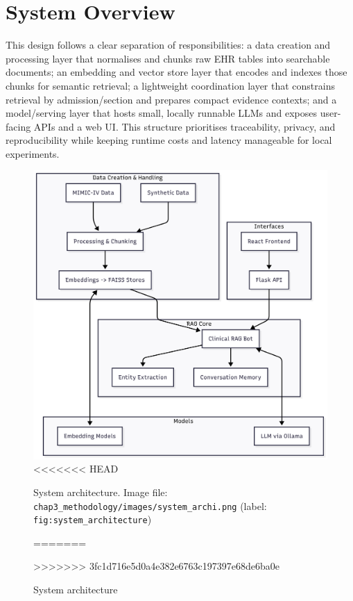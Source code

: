 \section{System Overview}

This design follows a clear separation of responsibilities: a data creation and processing layer that normalises and chunks raw EHR tables into searchable documents; an embedding and vector store layer that encodes and indexes those chunks for semantic retrieval; a lightweight coordination layer that constrains retrieval by admission/section and prepares compact evidence contexts; and a model/serving layer that hosts small, locally runnable LLMs and exposes user-facing APIs and a web UI. This structure prioritises traceability, privacy, and reproducibility while keeping runtime costs and latency manageable for local experiments.
\begin{figure}[H]
  \centering
  \includegraphics[width=0.95\linewidth]{chap3_methodology/images/system_archi.png}
<<<<<<< HEAD
  \caption{System architecture. Image file: \texttt{chap3_methodology/images/system_archi.png} (label: \texttt{fig:system_architecture})}
=======
  \caption{System architecture}
>>>>>>> 3fc1d716e5d0a4e382e6763c197397e68de6ba0e
  \label{fig:system_architecture}
\end{figure}


